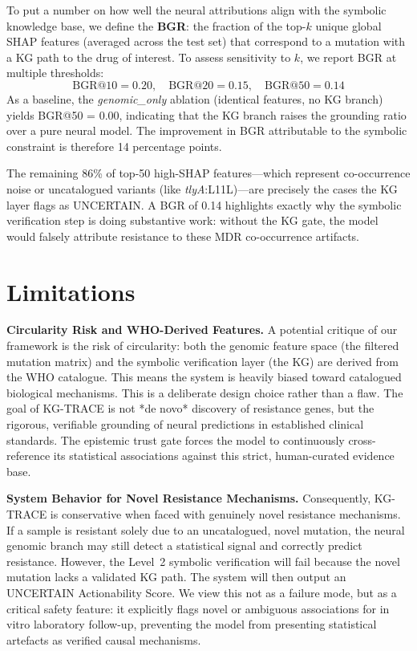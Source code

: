 \documentclass[conference]{IEEEtran}
\begin{document}
To put a number on how well the neural attributions align with the symbolic knowledge base, we define the \textbf{BGR}: the fraction of the top-$k$ unique global SHAP features (averaged across the test set) that correspond to a mutation with a KG path to the drug of interest. To assess sensitivity to $k$, we report BGR at multiple thresholds:
\begin{equation}
  \text{BGR}@10 = 0.20, \quad \text{BGR}@20 = 0.15, \quad \text{BGR}@50 = 0.14
\end{equation}
As a baseline, the \textit{genomic\_only} ablation (identical features, no KG branch) yields BGR@50 = 0.00, indicating that the KG branch raises the grounding ratio over a pure neural model. The improvement in BGR attributable to the symbolic constraint is therefore 14 percentage points.

The remaining 86\% of top-50 high-SHAP features---which represent co-occurrence noise or uncatalogued variants (like \textit{tlyA}:L11L)---are precisely the cases the KG layer flags as UNCERTAIN. A BGR of 0.14 highlights exactly why the symbolic verification step is doing substantive work: without the KG gate, the model would falsely attribute resistance to these MDR co-occurrence artifacts.

\section{Limitations}\label{sec:limitations}

\noindent\textbf{Circularity Risk and WHO-Derived Features.}
A potential critique of our framework is the risk of circularity: both the genomic feature space (the filtered mutation matrix) and the symbolic verification layer (the KG) are derived from the WHO catalogue. This means the system is heavily biased toward catalogued biological mechanisms. This is a deliberate design choice rather than a flaw. The goal of KG-TRACE is not *de novo* discovery of resistance genes, but the rigorous, verifiable grounding of neural predictions in established clinical standards. The epistemic trust gate forces the model to continuously cross-reference its statistical associations against this strict, human-curated evidence base.

\noindent\textbf{System Behavior for Novel Resistance Mechanisms.}
Consequently, KG-TRACE is conservative when faced with genuinely novel resistance mechanisms. If a sample is resistant solely due to an uncatalogued, novel mutation, the neural genomic branch may still detect a statistical signal and correctly predict resistance. However, the Level~2 symbolic verification will fail because the novel mutation lacks a validated KG path. The system will then output an UNCERTAIN Actionability Score. We view this not as a failure mode, but as a critical safety feature: it explicitly flags novel or ambiguous associations for in vitro laboratory follow-up, preventing the model from presenting statistical artefacts as verified causal mechanisms.
\end{document}
